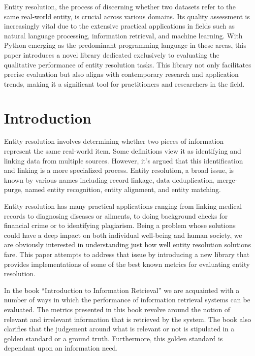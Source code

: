 \documentclass[11pt]{article}
\begin{document}
    \theoremstyle{definition}
    \newtheorem{defn}{Definition}[section]
    
    \abstract\label{abstract}

    Entity resolution, the process of discerning whether two datasets refer to
    the same real-world entity, is crucial across various domains.
    Its quality assessment is increasingly vital due to the extensive practical
    applications in fields such as natural language processing, information
    retrieval, and machine learning.
    With Python emerging as the predominant programming language in these areas,
    this paper introduces a novel library dedicated exclusively to evaluating
    the qualitative performance of entity resolution tasks.
    This library not only facilitates precise evaluation but also aligns with
    contemporary research and application trends, making it a significant tool
    for practitioners and researchers in the field.


    \section{Introduction}\label{sec:introduction}
    Entity resolution involves determining whether two pieces of information
    represent the same real-world item.
    Some definitions view it as identifying and linking data from multiple
    sources\cite{Qia17}.
    However, it's argued that this identification and linking is a more
    specialized process\cite{Tal11}.
    Entity resolution, a broad issue, is known by various names including record
    linkage, data deduplication, merge-purge, named entity recognition, entity
    alignment, and entity matching.

    Entity resolution has many practical applications ranging from linking
    medical records to diagnosing diseases or ailments, to doing background
    checks for financial crime or to identifying plagiarism.
    Being a problem whose solutions could have a deep impact on both individual
    well-being and human society, we are obviously interested in understanding
    just how well entity resolution solutions fare.
    This paper attempts to address that issue by introducing a new library that
    provides implementations of some of the best known metrics for evaluating
    entity resolution\cite{matchescu-er-metrics2023}.

    In the book ``Introduction to Information Retrieval'' we are acquainted with
    a number of ways in which the performance of information retrieval systems
    can be evaluated\cite{manning2008}.
    The metrics presented in this book revolve around the notion of relevant and
    irrelevant information that is retrieved by the system.
    The book also clarifies that the judgement around what is relevant or not is
    stipulated in a golden standard or a ground truth.
    Furthermore, this golden standard is dependant upon an information need.
\end{document}
